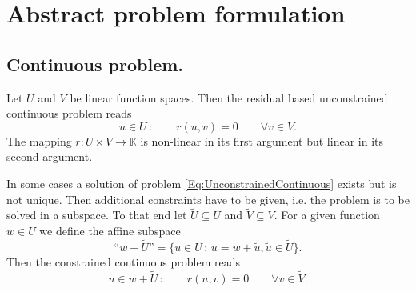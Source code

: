 \section{Abstract problem formulation}


\subsection{Continuous problem.}

Let $U$ and $V$ be linear function spaces. Then the residual based unconstrained
continuous problem reads 
\begin{equation}
\label{Eq:UnconstrainedContinuous}
u\in U \,: \qquad r(u,v) = 0 \qquad \forall v\in V .
\end{equation}
The mapping $r : U\times V \to \mathbb{K}$  is non-linear in its first argument but
linear in its second argument. 

In some cases a solution of problem \eqref{Eq:UnconstrainedContinuous}
exists but is not unique. Then additional constraints have to be
given, i.e. the problem is to be solved in a subspace. 
To that end let $\tilde{U}\subseteq U$ and
$\tilde{V}\subseteq V$. For a given function $w\in U$ we define the
affine subspace
\begin{equation*}
\text{``$w+\tilde{U}$''} = \{u\in U \,:\, u = w + \tilde{u}, \tilde{u}\in\tilde{U} \}.
\end{equation*}
Then the constrained continuous problem reads
\begin{equation}
u\in w+\tilde{U} \,: \qquad r(u,v) = 0 \qquad \forall v\in\tilde{V} .
\end{equation}

